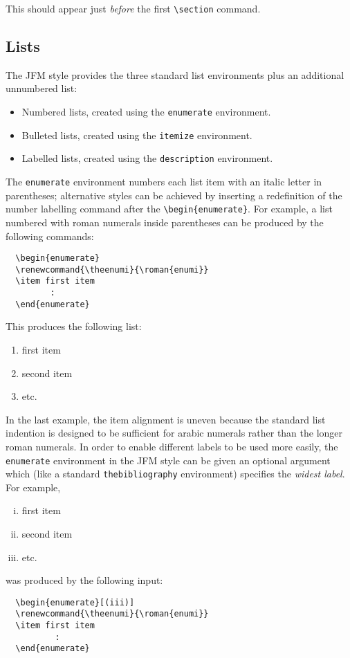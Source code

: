 \documentclass{jfm}
\newcommand\etc{etc.\ }
\begin{document}
This should appear just \emph{before} the first \verb"\section" command.

\subsection{Lists}

The JFM style provides the three standard list environments plus an additional
unnumbered list:
\begin{itemize}
  \item Numbered lists, created using the \verb"enumerate" environment.
  \item Bulleted lists, created using the \verb"itemize" environment.
  \item Labelled lists, created using the \verb"description" environment.
\end{itemize}
The \verb"enumerate" environment numbers each list item with an italic
letter in parentheses;
alternative styles can be achieved by inserting a redefinition of the
number labelling command after the \verb"\begin{enumerate}". For example, a
list numbered with roman numerals inside parentheses can be produced by the
following commands:
%
\begin{verbatim}
  \begin{enumerate}
  \renewcommand{\theenumi}{\roman{enumi}}
  \item first item
         :
  \end{enumerate}
\end{verbatim}
%
This produces the following list:
\begin{enumerate}
  \renewcommand{\theenumi}{\roman{enumi}}
  \item first item
  \item second item
  \item \etc
\end{enumerate}

In the last example, the item alignment is uneven because
the standard list indention is designed to be sufficient for arabic
numerals rather than the longer roman numerals. In order to enable
different labels to be used more easily, the \verb"enumerate" environment
in the JFM style can be given an optional argument which (like a standard
\verb"thebibliography" environment) specifies the \emph{widest label}. For
example,
\begin{enumerate}[(iii)]
  \renewcommand{\theenumi}{\roman{enumi}}
  \item first item
  \item second item
  \item \etc
\end{enumerate}
was produced by the following input:
%
\begin{verbatim}
  \begin{enumerate}[(iii)]
  \renewcommand{\theenumi}{\roman{enumi}}
  \item first item
          :
  \end{enumerate}
\end{verbatim}
\end{document}
